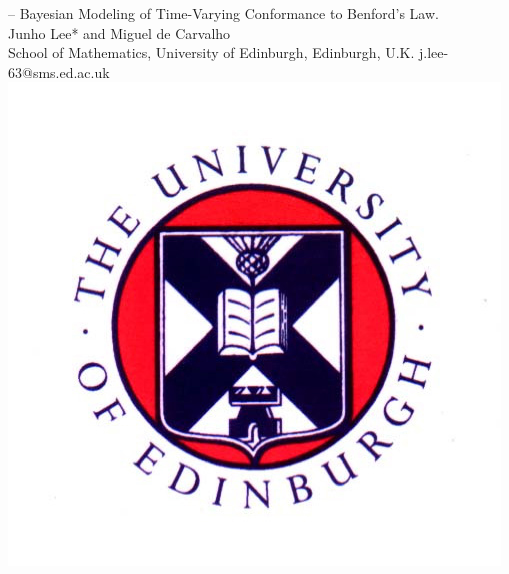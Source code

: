 \documentclass[a0paper,portrait]{baposter}
\renewcommand{\baselinestretch}{1}
\begin{document}
\begin{poster}
{{\LARGE -- Bayesian Modeling of Time-Varying Conformance to Benford's Law. \\
}
} %
{\indent \sf Junho Lee* and Miguel de Carvalho
\vspace{0.5em}\\
\indent \normalsize{ School of Mathematics, University of Edinburgh, Edinburgh, U.K. \qquad \qquad\qquad \qquad  * j.lee-63@sms.ed.ac.uk}
%
}
{\vspace{3em}\\
\includegraphics[scale=0.9]{logo.jpg}} %

\renewcommand{\baselinestretch}{1.1}

\end{poster}
\end{document}
